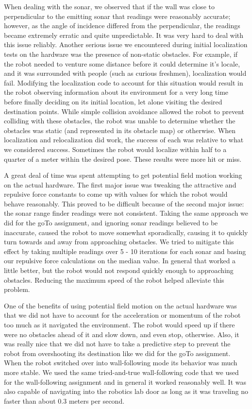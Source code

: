 \documentclass[11pt]{article}
\begin{document}
When dealing with the sonar, we observed that if the wall was close to perpendicular to the emitting sonar that readings were reasonably accurate; however, as the angle of incidence differed from the perpendicular, the readings became extremely erratic and quite unpredictable. It was very hard to deal with this issue reliably. Another serious issue we encountered during initial localization tests on the hardware was the presence of non-static obstacles. For example, if the robot needed to venture some distance before it could determine it's locale, and it was surrounded with people (such as curious freshmen), localization would fail. Modifying the localization code to account for this situation would result in the robot observing information about its environment for a very long time before finally deciding on its initial location, let alone visiting the desired destination points. While simple collision avoidance allowed the robot to prevent colliding with these obstacles, the robot was unable to determine whether the obstacles was static (and represented in its obstacle map) or otherwise. When localization and relocalization did work, the success of each was relative to what we considered success. Sometimes the robot would localize within half to a quarter of a meter within the desired pose.  These results were more hit or miss.

A great deal of time was spent attempting to get potential field motion working on the actual hardware. The first major issue was tweaking the attractive and repulsive force constants to come up with values for which the robot would behave reasonably. This proved to be difficult because of the second major issue: the sonar range finder readings were not consistent. Taking the same approach we did for the goTo assignment, and ignoring sonar readings believed to be inaccurate, caused the robot to move somewhat sporadically, causing it to quickly turn towards and away from approaching obstacles. We tried to mitigate this effect by taking multiple readings over 5 - 10 iterations for each sonar and basing our repulsive force calculations on the median value. In general that worked a little better, but the robot would not respond quickly enough to approaching obstacles. Reducing the maximum speed of the robot helped alleviate this problem.

One of the benefits of using potential field motion on the actual hardware was that we did not have to account for the acceleration or momentum of the robot too much as it navigated the environment. The robot would speed up if there were no obstacles ahead of it and slow down, and even stop, otherwise. Also, it was really nice that we did not have to take a predictive step to prevent the robot from overshooting its destination like we did for the goTo assignment. When the robot switched over into wall-following mode its behavior was much more stable. We used the same tried-and-true wall-following code that we used for the wall-following assignment and in general it worked reasonably well. It was also capable of navigating into the robotics lab door as long as it was traveling no faster than about 0.3 meters per second.
\end{document}
